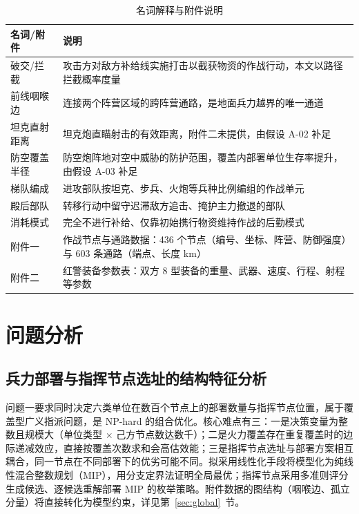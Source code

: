 \documentclass[12pt,a4paper]{ctexart}
\begin{document}
\begin{table}[H]
\centering
\caption{名词解释与附件说明}
\label{tab:terms}
\begin{tabular}{p{2.8cm}p{10.8cm}}
\toprule
名词/附件 & 说明 \\
\midrule
破交/拦截 & 攻击方对敌方补给线实施打击以截获物资的作战行动，本文以路径拦截概率度量 \\
前线咽喉边 & 连接两个阵营区域的跨阵营通路，是地面兵力越界的唯一通道 \\
坦克直射距离 & 坦克炮直瞄射击的有效距离，附件二未提供，由假设 A-02 补足 \\
防空覆盖半径 & 防空炮阵地对空中威胁的防护范围，覆盖内部署单位生存率提升，由假设 A-03 补足 \\
梯队编成 & 进攻部队按坦克、步兵、火炮等兵种比例编组的作战单元 \\
殿后部队 & 转移行动中留守迟滞敌方追击、掩护主力撤退的部队 \\
消耗模式 & 完全不进行补给、仅靠初始携行物资维持作战的后勤模式 \\
附件一 & 作战节点与通路数据：436 个节点（编号、坐标、阵营、防御强度）与 603 条通路（端点、长度 km） \\
附件二 & 红警装备参数表：双方 8 型装备的重量、武器、速度、行程、射程等参数 \\
\bottomrule
\end{tabular}
\end{table}

\section{问题分析}

\subsection{兵力部署与指挥节点选址的结构特征分析}

问题一要求同时决定六类单位在数百个节点上的部署数量与指挥节点位置，属于覆盖型广义指派问题，是 NP-hard 的组合优化\cite{ref3,ref4}。核心难点有三：一是决策变量为整数且规模大（单位类型 $\times$ 己方节点数达数千）；二是火力覆盖存在重复覆盖时的边际递减效应，直接按覆盖次数求和会高估效能；三是指挥节点选址与部署方案相互耦合，同一节点在不同部署下的优劣可能不同。拟采用线性化手段将模型化为纯线性混合整数规划（MIP），用分支定界法证明全局最优；指挥节点采用多准则评分生成候选、逐候选重解部署 MIP 的枚举策略。附件数据的图结构（咽喉边、孤立分量）将直接转化为模型约束，详见第~\ref{sec:global}~节。
\end{document}
